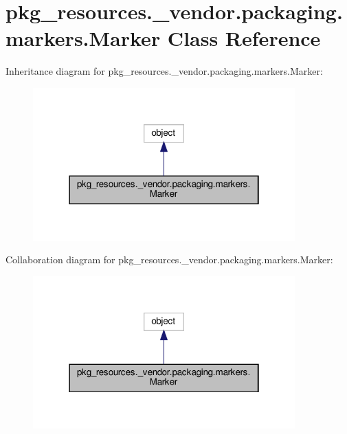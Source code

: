 \hypertarget{classpkg__resources_1_1__vendor_1_1packaging_1_1markers_1_1Marker}{}\section{pkg\+\_\+resources.\+\_\+vendor.\+packaging.\+markers.\+Marker Class Reference}
\label{classpkg__resources_1_1__vendor_1_1packaging_1_1markers_1_1Marker}


Inheritance diagram for pkg\+\_\+resources.\+\_\+vendor.\+packaging.\+markers.\+Marker\+:
\nopagebreak
\begin{figure}[H]
\begin{center}
\leavevmode
\includegraphics[width=286pt]{classpkg__resources_1_1__vendor_1_1packaging_1_1markers_1_1Marker__inherit__graph}
\end{center}
\end{figure}


Collaboration diagram for pkg\+\_\+resources.\+\_\+vendor.\+packaging.\+markers.\+Marker\+:
\nopagebreak
\begin{figure}[H]
\begin{center}
\leavevmode
\includegraphics[width=286pt]{classpkg__resources_1_1__vendor_1_1packaging_1_1markers_1_1Marker__coll__graph}
\end{center}
\end{figure}

